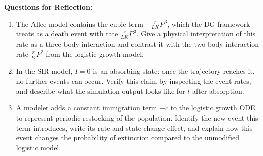 \noindent \textup{{\bf Questions for Reflection:}}
\begin{enumerate}
\item The Allee model contains the cubic term $-\frac{r}{LK}P^3$, which the DG framework treats as a death event with rate $\frac{r}{LK}P^3$. Give a physical interpretation of this rate as a three-body interaction and contrast it with the two-body interaction rate $\frac{r}{K}P^2$ from the logistic growth model.

\item In the SIR model, $I = 0$ is an absorbing state: once the trajectory reaches it, no further events can occur. Verify this claim by inspecting the event rates, and describe what the simulation output looks like for $t$ after absorption.

\item A modeler adds a constant immigration term $+c$ to the logistic growth ODE to represent periodic restocking of the population. Identify the new event this term introduces, write its rate and state-change effect, and explain how this event changes the probability of extinction compared to the unmodified logistic model.
\end{enumerate}
